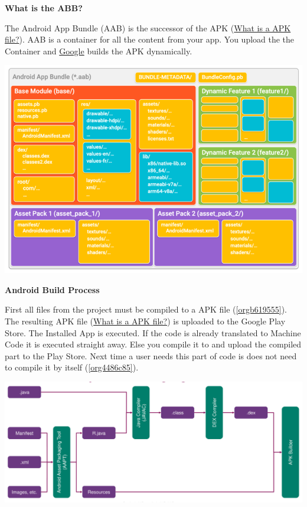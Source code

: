 \documentclass[11pt,twoside,landscape]{article}
\begin{document}
\begin{multicols}{3}
\textbf{What is the ABB?}

The Android App Bundle (AAB) is the successor of the APK (\href{../../../roam/20211109113541-what_is_a_apk_file.org}{What is a APK file?}).
AAB is a container for all the content from your app. You upload the the Container and \href{../../../roam/20211111145536-google.org}{Google} builds the APK dynamically. 

\begin{center}
\includegraphics[width=.9\linewidth]{img/android_app_bundle.png}
\end{center}

\textbf{Android Build Process}

First all files from the project must be compiled to a APK file (\ref{orgb619555}).
The resulting APK file (\href{../../../roam/20211109113541-what_is_a_apk_file.org}{What is a APK file?}) is uploaded to the Google Play Store.
The Installed App is executed.
If the code is already translated to Machine Code it is executed straight away.
Else you compile it to and upload the compiled part to the Play Store.
Next time a user needs this part of code is does not need to compile it by itself (\ref{org4486c85}). 

\begin{center}
\includegraphics[width=.9\linewidth]{img/android_build_system_create_apk.png}
\label{orgb619555}
\end{center}



\end{multicols}
\end{document}
